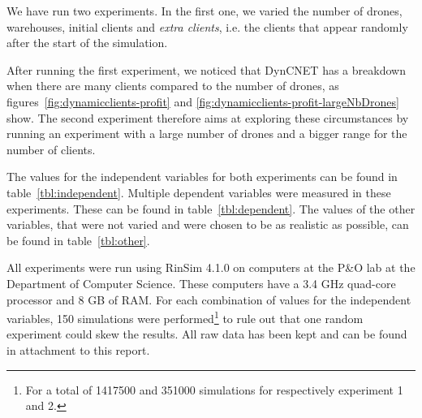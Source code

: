 \documentclass[10pt,a4paper,twocolumn]{article}
\begin{document}
We have run two experiments. In the first one, we varied the number of drones, warehouses, initial clients and \textit{extra clients}, i.e. the clients that appear randomly after the start of the simulation. 

After running the first experiment, we noticed that DynCNET has a breakdown when there are many clients compared to the number of drones, as figures~\ref{fig:dynamicclients-profit} and \ref{fig:dynamicclients-profit-largeNbDrones} show. The second experiment therefore aims at exploring these circumstances by running an experiment with a large number of drones and a bigger range for the number of clients.

The values for the independent variables for both experiments can be found in table~\ref{tbl:independent}. Multiple dependent variables were measured in these experiments. These can be found in table~\ref{tbl:dependent}.  The values of the other variables, that were not varied and were chosen to be as realistic as possible, can be found in table~\ref{tbl:other}.

All experiments were run using RinSim 4.1.0 on computers at the P\&O lab at the Department of Computer Science. These computers have a 3.4 GHz quad-core processor and 8 GB of RAM. For each combination of values for the independent variables, 150 simulations were performed\footnote{For a total of 1417500 and 351000 simulations for respectively experiment 1 and 2.} to rule out that one random experiment could skew the results. All raw data has been kept and can be found in attachment to this report.
\end{document}
